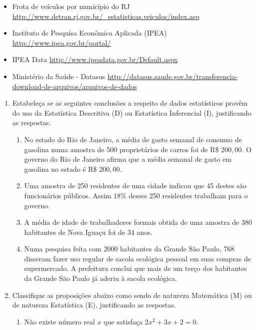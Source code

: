 {\begin{itemize}
\item {} 
Frota de veículos por município do RJ \textendash{} \url{http://www.detran.rj.gov.br/\_estatisticas.veiculos/index.asp}

\item {} 
Instituto de Pesquisa Econômica Aplicada (IPEA) \textendash{} \url{http://www.ipea.gov.br/portal/}

\item {} 
IPEA Data \textendash{} \url{http://www.ipeadata.gov.br/Default.aspx}

\item {} 
Ministério da Saúde - Datasus \textendash{} \url{http://datasus.saude.gov.br/transferencia-download-de-arquivos/arquivos-de-dados}

\end{itemize}
\clearpage

\exercise
\label{\detokenize{PE103-E:exercicios}}\label{\detokenize{PE103-E::doc}}
\begin{enumerate}
\item Estabeleça se as seguintes conclusões a respeito de dados estatísticos provêm do uso da Estatística Descritiva (D) ou Estatística Inferencial (I), justificando as respostas.
\begin{enumerate}
\item {} 
No estado do Rio de Janeiro, a média de gasto semanal de consumo de gasolina numa amostra de 500 proprietários de carros foi de R\$ $200{,}00$. O governo do Rio de Janeiro afirma que a média semanal de gasto em gasolina no estado é R\$ $200{,}00$.

\item {} 
Uma amostra de 250 residentes de uma cidade indicou que 45 destes são funcionários públicos. Assim $18\%$ desses 250 residentes trabalham para o governo.

\item {} 
A média de idade de trabalhadores formais obtida de uma amostra de 380 habitantes de Nova Iguaçu foi de 34 anos.

\item {} 
Numa pesquisa feita com 2000 habitantes da Grande São Paulo, 768 disseram fazer uso regular de sacola ecológica pessoal em suas compras de supermercado.  A prefeitura conclui que mais de um terço dos habitantes da Grande São Paulo já aderiu à sacola ecológica.

\end{enumerate}

\item Classifique as proposições abaixo como sendo de natureza Matemática (M) ou de natureza Estatística (E), justificando as respostas.
\begin{enumerate}
\item {} 
Não existe número real \(x\) que satisfaça \(2x^2 + 3x + 2 = 0\).


\end{enumerate}
\end{enumerate}}
